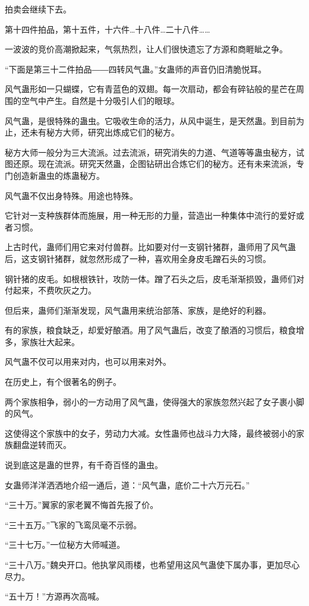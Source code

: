 \begin{this_body}
拍卖会继续下去。

第十四件拍品，第十五件，十六件…十八件…二十八件……

一波波的竞价高潮掀起来，气氛热烈，让人们很快遗忘了方源和商睚眦之争。

“下面是第三十二件拍品――四转风气蛊。”女蛊师的声音仍旧清脆悦耳。

风气蛊形如一只蝴蝶，它有青蓝色的双翅。每一次扇动，都会有碎钻般的星芒在周围的空气中产生。自然是十分吸引人们的眼球。

风气蛊，是很特殊的蛊虫。它吸收生命的活力，从风中诞生，是天然蛊。到目前为止，还未有秘方大师，研究出炼成它们的秘方。

秘方大师一般分为三大流派。过去流派，研究消失的力道、气道等等蛊虫秘方，试图还原。现在流派。研究天然蛊，企图钻研出合炼它们的秘方。还有未来流派，专门创造新蛊虫的炼蛊秘方。

风气蛊不仅出身特殊。用途也特殊。

它针对一支种族群体而施展，用一种无形的力量，营造出一种集体中流行的爱好或者习惯。

上古时代，蛊师们用它来对付兽群。比如要对付一支钢针猪群，蛊师用了风气蛊后，这支钢针猪群，就忽然形成了一种，喜欢用全身皮毛蹭石头的习惯。

钢针猪的皮毛。如根根铁针，攻防一体。蹭了石头之后，皮毛渐渐损毁，蛊师们对付起来，不费吹灰之力。

但后来，蛊师们渐渐发现，风气蛊用来统治部落、家族，是绝好的利器。

有的家族，粮食缺乏，却爱好酿酒。用了风气蛊后，改变了酿酒的习惯后，粮食增多，家族壮大起来。

风气蛊不仅可以用来对内，也可以用来对外。

在历史上，有个很著名的例子。

两个家族相争，弱小的一方动用了风气蛊，使得强大的家族忽然兴起了女子裹小脚的风气。

这使得这个家族中的女子，劳动力大减。女性蛊师也战斗力大降，最终被弱小的家族翻盘逆转而灭。

说到底这是蛊的世界，有千奇百怪的蛊虫。

女蛊师洋洋洒洒地介绍一通后，道：“风气蛊，底价二十六万元石。”

“三十万。”翼家的家老翼不悔首先报了价。

“三十五万。”飞家的飞鸾凤毫不示弱。

“三十七万。”一位秘方大师喊道。

“三十八万。”魏央开口。他执掌风雨楼，也希望用这风气蛊使下属办事，更加尽心尽力。

“五十万！”方源再次高喊。


\end{this_body}
